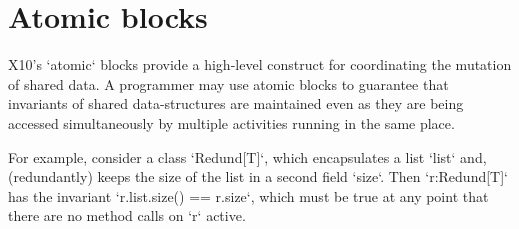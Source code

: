
\section{Atomic blocks}\label{AtomicBlocks}

X10's \xcd`atomic` blocks provide a high-level construct for coordinating
the mutation of shared data. 
A programmer may use atomic blocks to guarantee that invariants of
shared data-structures are maintained even as they are being accessed
simultaneously by multiple activities running in the same place.  

For example, consider a class \xcd`Redund[T]`, which encapsulates a list
\xcd`list` and, (redundantly) keeps the size of the list in a second field
\xcd`size`.  Then \xcd`r:Redund[T]` has the invariant 
\xcd`r.list.size() == r.size`, which must be true at any point that there are
no method calls on \xcd`r` active.

